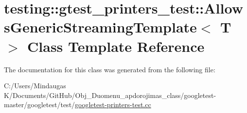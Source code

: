 \hypertarget{classtesting_1_1gtest__printers__test_1_1_allows_generic_streaming_template}{}\section{testing\+::gtest\+\_\+printers\+\_\+test\+::Allows\+Generic\+Streaming\+Template$<$ T $>$ Class Template Reference}
\label{classtesting_1_1gtest__printers__test_1_1_allows_generic_streaming_template}


The documentation for this class was generated from the following file\+:\begin{DoxyCompactItemize}
\item 
C\+:/\+Users/\+Mindaugas K/\+Documents/\+Git\+Hub/\+Obj\+\_\+\+Duomenu\+\_\+apdorojimas\+\_\+class/googletest-\/master/googletest/test/\mbox{\hyperlink{googletest-master_2googletest_2test_2googletest-printers-test_8cc}{googletest-\/printers-\/test.\+cc}}\end{DoxyCompactItemize}
